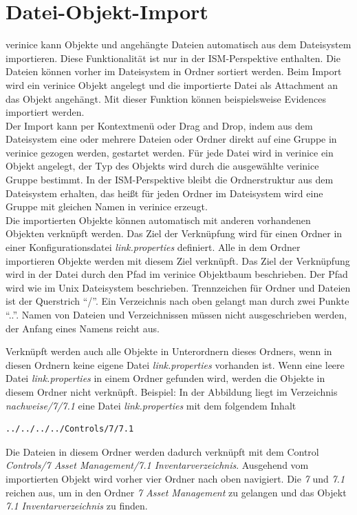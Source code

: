 \documentclass[a4paper,10pt]{book}
\begin{document}
\section{Datei-Objekt-Import} \label{Datei-Objekt-Import}
verinice kann Objekte und angehängte Dateien automatisch aus dem Dateisystem importieren. Diese Funktionalität ist nur in der ISM-Perspektive enthalten. Die Dateien können vorher im Dateisystem in Ordner sortiert werden. Beim Import wird ein verinice Objekt angelegt und die importierte Datei als Attachment an das Objekt angehängt. Mit dieser Funktion können beispielsweise Evidences importiert werden.
\newline\\
Der Import kann per Kontextmenü oder Drag and Drop, indem aus dem Dateisystem eine oder mehrere Dateien oder Ordner direkt auf eine Gruppe in verinice gezogen werden, gestartet werden. Für jede Datei wird in verinice ein Objekt angelegt, der Typ des Objekts wird durch die ausgewählte verinice Gruppe bestimmt. In der ISM-Perspektive bleibt die Ordnerstruktur aus dem Dateisystem erhalten, das heißt für jeden Ordner im Dateisystem wird eine Gruppe mit gleichen Namen in verinice erzeugt.
\newline\\
Die importierten Objekte können automatisch mit anderen vorhandenen Objekten verknüpft
werden. Das Ziel der Verknüpfung wird für einen Ordner in einer Konfigurationsdatei
\textit{link.properties} definiert. Alle in dem Ordner importieren Objekte werden mit diesem Ziel
verknüpft. Das Ziel der Verknüpfung wird in der Datei durch den Pfad im verinice Objektbaum
beschrieben. Der Pfad wird wie im Unix Dateisystem beschrieben. Trennzeichen für Ordner und
Dateien ist der Querstrich ``/''. Ein Verzeichnis nach oben gelangt man durch zwei Punkte ``..''.
Namen von Dateien und Verzeichnissen müssen nicht ausgeschrieben werden, der Anfang eines
Namens reicht aus.

Verknüpft werden auch alle Objekte in Unterordnern dieses Ordners, wenn in diesen Ordnern
keine eigene Datei \textit{link.properties} vorhanden ist. Wenn eine leere Datei \textit{link.properties} in einem
Ordner gefunden wird, werden die Objekte in diesem Ordner nicht verknüpft.
Beispiel:
In der Abbildung liegt im Verzeichnis \textit{nachweise/7/7.1} eine Datei \textit{link.properties} mit dem folgendem Inhalt
\begin{verbatim}
../../../../Controls/7/7.1
\end{verbatim}
Die Dateien in diesem Ordner werden dadurch verknüpft mit dem Control \textit{Controls/7 Asset Management/7.1 Inventarverzeichnis}. Ausgehend vom importierten Objekt wird vorher vier Ordner nach oben navigiert. Die \textit{7} und \textit{7.1} reichen aus, um in den Ordner \textit{7 Asset Management} zu gelangen und das Objekt \textit{7.1 Inventarverzeichnis} zu finden.
\end{document}
